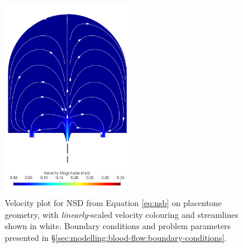             \begin{figure}
                    \centering
                    \includegraphics[width=0.5\textwidth]{diagrams/results-modelling/velocity-transport/meshandsoln_dg_velocity_placentone_nsb_velocity-linear.png}
                    \caption{Velocity plot for NSD from Equation \eqref{eq:nsb} on placentone geometry, with \textit{linearly}-scaled velocity colouring and streamlines shown in white. Boundary conditions and problem parameters presented in \S\ref{sec:modelling:blood-flow:boundary-conditions}.}
                    \label{fig:4-models-placentone-linear:nsb}
            \end{figure}
            
